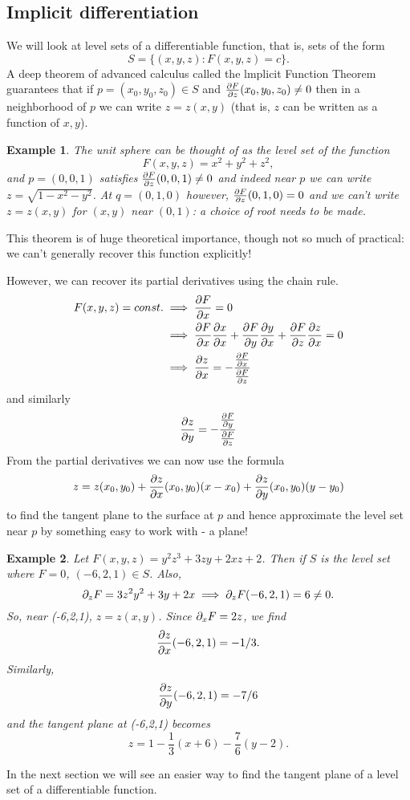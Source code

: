 \documentclass[12pt]{article}
\newtheorem{example}{Example}
\begin{document}
\subsection*{Implicit differentiation}
We will look at level sets of a differentiable function, that is, sets of the form $$S=\{(x,y,z):F(x,y,z)=c\}.$$ A deep theorem of advanced calculus called the lmplicit Function Theorem guarantees that if $p=(x_0,y_0,z_0)\in S$ and $\frac{\partial F}{\partial z}(x_0,y_0,z_0)\neq 0$ then in a neighborhood of $p$ we can write $z=z(x,y)$ (that is, $z$
can be written as a function of $x, y$). 
\begin{example}
The unit sphere can be thought of as the level set of the function $$F(x,y,z)=x^2+y^2+z^2,$$ and $p=(0,0,1)$ satisfies $\frac{\partial F}{\partial z}(0,0,1)\neq 0$ and indeed near $p$ we can write $z=\sqrt{1-x^2-y^2}$. At $q=(0,1,0)$ however, $\frac{\partial F}{\partial z}(0,1,0)= 0$ and we can't write $z=z(x,y)$ for $(x,y)$ near $(0,1)$: a choice of root needs to be made.
\end{example}
This theorem is of huge theoretical importance, though not so much of practical: we can't generally recover this function explicitly!

However, we can recover its partial derivatives using the chain rule.
\begin{align*}
F(x,y,z)=const.&\implies \frac{\partial F}{\partial x}=0\\
&\implies \frac{\partial F}{\partial x}\frac{\partial x}{\partial x}+\frac{\partial F}{\partial y}\frac{\partial y}{\partial x}+\frac{\partial F}{\partial z}\frac{\partial z}{\partial x}=0\\
&\implies \frac{\partial z}{\partial x}=-\frac{\frac{\partial F}{\partial x}}{\frac{\partial F}{\partial z}}
\end{align*}
and similarly $$\frac{\partial z}{\partial y}=-\frac{\frac{\partial F}{\partial y}}{\frac{\partial F}{\partial z}}$$
From the partial derivatives we can now use the formula $$z=z(x_0,y_0)+\frac{\partial z}{\partial x}(x_0,y_0)(x-x_0)+\frac{\partial z}{\partial y}(x_0,y_0)(y-y_0)$$ to find the tangent plane to the surface at $p$ and hence approximate the level set near $p$ by something easy to work with - a plane!

\begin{example}
Let $F(x,y,z)=y^2z^3+3zy+2xz+2$. Then if $S$ is the level set where $F=0$, $(-6,2,1)\in S$. Also, $$\partial_z F=3z^2y^2+3y+2x\implies \partial_zF(-6,2,1)=6\neq 0.$$ So, near (-6,2,1), $z=z(x,y)$. Since $\partial_xF=2z$, we find $$\frac{\partial z}{\partial x}(-6,2,1)=-1/3.$$ Similarly, $$\frac{\partial z}{\partial y}(-6,2,1)=-7/6$$ and the tangent plane at (-6,2,1) becomes $$z=1-\frac{1}{3}(x+6)-\frac{7}{6}(y-2).$$
\end{example}
In the next section we will see an easier way to find the tangent plane of a level set of a differentiable function.
\end{document}
